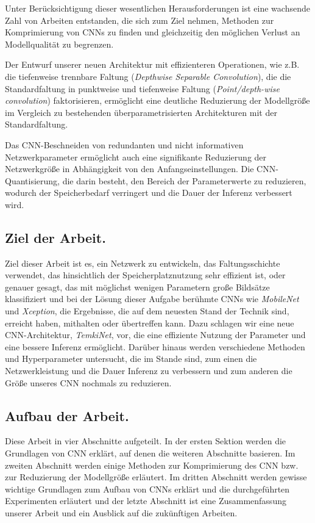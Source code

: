 \documentclass[12pt,a4paper]{scrartcl}
\numberwithin{equation}{section}
\begin{document}
Unter Berücksichtigung dieser wesentlichen Herausforderungen ist eine wachsende Zahl von Arbeiten entstanden, die sich zum Ziel nehmen, Methoden zur Komprimierung von \acsp{CNN} zu finden und gleichzeitig den möglichen Verlust an Modellqualität zu begrenzen.

Der Entwurf unserer neuen Architektur mit effizienteren Operationen, wie z.B. die tiefenweise trennbare Faltung (\textit{Depthwise Separable Convolution}), die die Standardfaltung in punktweise und tiefenweise Faltung (\textit{Point/depth-wise convolution}) faktorisieren, ermöglicht eine deutliche Reduzierung der Modellgröße im Vergleich zu bestehenden überparametrisierten Architekturen mit der Standardfaltung.

Das CNN-Beschneiden von redundanten und nicht informativen Netzwerkparameter ermöglicht auch eine signifikante Reduzierung der Netzwerkgröße in Abhängigkeit von den Anfangseinstellungen.
Die CNN-Quantisierung, die darin besteht, den Bereich der Parameterwerte zu reduzieren, wodurch der Speicherbedarf verringert und die Dauer der Inferenz verbessert wird.

\subsection{Ziel der Arbeit.}

Ziel dieser Arbeit ist es, ein Netzwerk zu entwickeln, das Faltungsschichte verwendet, das hinsichtlich der Speicherplatznutzung sehr effizient ist, oder genauer gesagt, das mit möglichst wenigen Parametern große Bildsätze klassifiziert und bei der Lösung dieser Aufgabe  berühmte CNNs wie \textit{MobileNet} und \textit{Xception}, die Ergebnisse, die auf dem neuesten Stand der Technik sind, erreicht haben, mithalten oder übertreffen kann. Dazu schlagen wir eine neue CNN-Architektur, \textit{TemkiNet}, vor, die eine effiziente Nutzung der Parameter und eine bessere Inferenz ermöglicht. Darüber hinaus werden verschiedene Methoden und Hyperparameter untersucht, die im Stande sind, zum einen die Netzwerkleistung und die Dauer Inferenz zu verbessern und zum anderen die Größe unseres \ac{CNN} nochmals zu reduzieren.  


\subsection{Aufbau der Arbeit.}
Diese Arbeit in vier Abschnitte aufgeteilt. In der ersten Sektion werden die Grundlagen von CNN erklärt, auf denen die weiteren Abschnitte basieren. Im zweiten Abschnitt werden einige Methoden zur Komprimierung des CNN bzw. zur Reduzierung der Modellgröße erläutert. Im dritten Abschnitt werden gewisse wichtige Grundlagen zum Aufbau von \acsp{CNN} erklärt und die durchgeführten Experimenten erläutert und der letzte Abschnitt ist eine Zusammenfassung unserer Arbeit und ein Ausblick auf die zukünftigen Arbeiten.
\end{document}
